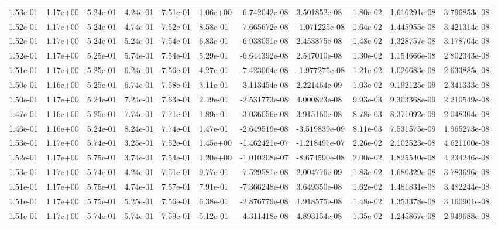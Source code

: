 \begin{longtable}{| p{} | p{} |}
1.53e-01 & 1.17e+00 & 5.24e-01 & 4.24e-01 & 7.51e-01 & 1.06e+00 & -6.742042e-08 &  3.501852e-08 &  1.80e-02 &  1.616291e-08 &  3.796853e-08 \\
1.52e-01 & 1.17e+00 & 5.24e-01 & 4.74e-01 & 7.52e-01 & 8.58e-01 & -7.665672e-08 & -1.071225e-08 &  1.64e-02 &  1.445955e-08 &  3.421314e-08 \\
1.52e-01 & 1.17e+00 & 5.24e-01 & 5.24e-01 & 7.54e-01 & 6.83e-01 & -6.938051e-08 &  2.453875e-08 &  1.48e-02 &  1.328757e-08 &  3.178704e-08 \\
1.52e-01 & 1.17e+00 & 5.25e-01 & 5.74e-01 & 7.54e-01 & 5.29e-01 & -6.644392e-08 &  2.547010e-08 &  1.30e-02 &  1.154666e-08 &  2.802343e-08 \\
1.51e-01 & 1.17e+00 & 5.25e-01 & 6.24e-01 & 7.56e-01 & 4.27e-01 & -7.423064e-08 & -1.977275e-08 &  1.21e-02 &  1.026683e-08 &  2.633885e-08 \\
1.50e-01 & 1.16e+00 & 5.25e-01 & 6.74e-01 & 7.58e-01 & 3.11e-01 & -3.113454e-08 &  2.221464e-09 &  1.03e-02 &  9.192125e-09 &  2.341333e-08 \\
1.50e-01 & 1.17e+00 & 5.24e-01 & 7.24e-01 & 7.63e-01 & 2.49e-01 & -2.531773e-08 &  4.000823e-08 &  9.93e-03 &  9.303368e-09 &  2.210549e-08 \\
1.47e-01 & 1.16e+00 & 5.25e-01 & 7.74e-01 & 7.71e-01 & 1.89e-01 & -3.036056e-08 &  3.915160e-08 &  8.78e-03 &  8.371092e-09 &  2.048304e-08 \\
1.46e-01 & 1.16e+00 & 5.24e-01 & 8.24e-01 & 7.74e-01 & 1.47e-01 & -2.649519e-08 & -3.519839e-09 &  8.11e-03 &  7.531575e-09 &  1.965273e-08 \\
1.53e-01 & 1.17e+00 & 5.74e-01 & 3.25e-01 & 7.52e-01 & 1.45e+00 & -1.462421e-07 & -1.218497e-07 &  2.26e-02 &  2.102523e-08 &  4.621100e-08 \\
1.52e-01 & 1.17e+00 & 5.75e-01 & 3.74e-01 & 7.54e-01 & 1.20e+00 & -1.010208e-07 & -8.674590e-08 &  2.00e-02 &  1.825540e-08 &  4.234246e-08 \\
1.53e-01 & 1.17e+00 & 5.74e-01 & 4.24e-01 & 7.51e-01 & 9.77e-01 & -7.529581e-08 &  2.004776e-09 &  1.83e-02 &  1.680329e-08 &  3.783696e-08 \\
1.51e-01 & 1.17e+00 & 5.75e-01 & 4.74e-01 & 7.57e-01 & 7.91e-01 & -7.366248e-08 &  3.649350e-08 &  1.62e-02 &  1.481831e-08 &  3.482244e-08 \\
1.51e-01 & 1.17e+00 & 5.75e-01 & 5.25e-01 & 7.56e-01 & 6.38e-01 & -2.876779e-08 &  1.918575e-08 &  1.48e-02 &  1.353378e-08 &  3.160901e-08 \\
1.51e-01 & 1.17e+00 & 5.74e-01 & 5.74e-01 & 7.59e-01 & 5.12e-01 & -4.311418e-08 &  4.893154e-08 &  1.35e-02 &  1.245867e-08 &  2.949688e-08 \\

\end{longtable}
